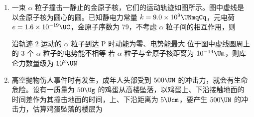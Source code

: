 \documentclass[\gkver]{gaokaozhenti}
\begin{document}
\begin{enumerate}
{可得总耗电量为 $W = Pt_{\text{总}} = 0.06\UkW \times 21900\Uh = 1314\UkWh = 1314$ 度

因 $1\Ukg$ 标准煤完全燃烧可发电 2.8 度，排放二氧化碳 $2.6\Ukg$，则减少的二氧化碳排放量为 $M = \frac{1314}{2.8} \times 2.6\Ukg \approx 1220\Ukg \neq 1.2 \times 10^{6}\Ukg$，故 C 错误；

D．已知储能电池的额定电压 $U = 48\UV$，容量 $Q = 200\UAh$，则电池的电能为 $E = UQ = 9600\UWh = 9.6\UkWh$

而路灯连续一周的耗电量为 $W = Pt = 0.06\UkW \times 7 \times 10\Uh = 4.2\UkWh$

因 $9.6\UkWh > 4.2\UkWh$，所以储能电池充满电后，即使连续一周无风且阴雨，路灯也能正常工作。故 D 正确。

故选 D。
}

\item
一束 $\alpha$ 粒子撞击一静止的金原子核，它们的运动轨迹如图所示。图中虚线是以金原子核为圆心的圆。已知静电力常量 $k = 9.0 \times 10^{9}\UNmqCq$，元电荷 $e = 1.6 \times 10^{-19}\UC$，金原子序数为 79，不考虑 $\alpha$ 粒子间的相互作用，则


{沿轨迹 2 运动的 $\alpha$ 粒子到达 P 时动能为零、电势能最大}
{位于图中虚线圆周上的 3 个 $\alpha$ 粒子的电势能不相等}
{若 $\alpha$ 粒子与金原子核距离为 $10^{-14}\Um$，则库仑力数量级为 $10^{2}\UN$}


\item
高空抛物伤人事件时有发生，成年人头部受到 $500\UN$ 的冲击力，就会有生命危险。设有一质量为 $50\Ug$ 的鸡蛋从高楼坠落，以鸡蛋上、下沿接触地面的时间差作为其撞击地面的时间，上、下沿距离为 $5\Ucm$，要产生 $500\UN$ 的冲击力，估算鸡蛋坠落的楼层为


\end{enumerate}
\end{document}
